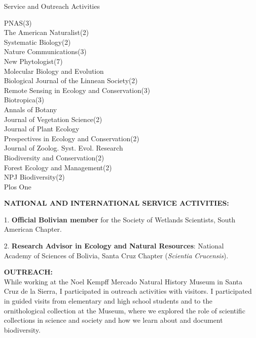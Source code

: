 \documentclass{resume} %
\begin{document}
\begin{rSection}{Service and Outreach Activities}
\begin{multicols}{2}
\columnbreak

PNAS(3) \\
The American Naturalist(2) \\ 
Systematic Biology(2) \\
Nature Communications(3) \\
New Phytologist(7) \\ 
Molecular Biology and Evolution \\ 
Biological Journal of the Linnean Society(2) \\
Remote Sensing in Ecology and Conservation(3) \\ 
Biotropica(3) \\ 
Annals of Botany \\ 
Journal of Vegetation Science(2) \\ 
Journal of Plant Ecology \\ 
Prespectives in Ecology and Conservation(2) \\
Journal of Zoolog. Syst. Evol. Research \\
Biodiversity and Conservation(2) \\
Forest Ecology and Management(2) \\ 
NPJ Biodiversity(2) \\
Plos One \smallskip

\end{multicols}

\textbf{NATIONAL AND INTERNATIONAL SERVICE ACTIVITIES:} \smallskip 

\item 1. \textbf{Official Bolivian member} for the Society of Wetlands Scientists, South American Chapter. 

\item 2. \textbf{Research Advisor in Ecology and Natural Resources}: National Academy of Sciences of Bolivia, Santa Cruz Chapter ({\em Scientia Crucensis}). 

\textbf{OUTREACH:} \smallskip \\ 
While working at the Noel Kempff Mercado Natural History Museum in Santa Cruz de la Sierra, I participated in outreach activities with visitors. I participated in guided visits from elementary and high school students and to the ornithological collection at the Museum, where we explored the role of scientific collections in science and society and how we learn about and document biodiversity.


\end{rSection}
\end{document}
